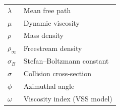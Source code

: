 \begin{longtable}{|p{3.4cm}|p{8.2cm}|}
    $\lambda$   & Mean free path                        \\
    $\mu$       & Dynamic viscosity                     \\
    $\rho$      & Mass density                          \\
    $\rho_\infty$ & Freestream density                  \\
    $\sigma_B$  & Stefan--Boltzmann constant            \\
    $\sigma$    & Collision cross-section               \\
    $\phi$      & Azimuthal angle                       \\
    $\omega$    & Viscosity index (VSS model)           \\
\hline
\end{longtable}
\endgroup

